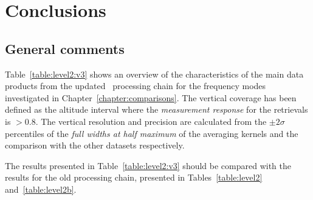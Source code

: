 \chapter{Conclusions}
\label{chapter:conclusions}
\section{General comments}
Table~\ref{table:level2:v3} shows an overview of the characteristics of the
main data products from the updated \smr\ processing chain for the frequency
modes investigated in Chapter~\ref{chapter:comparisons}. The vertical coverage
has been defined as the altitude interval where the \emph{measurement response}
for the retrievals is $>0.8$. The vertical resolution and precision are
calculated from the $\pm 2\sigma$ percentiles of the \emph{full widths at half
maximum} of the averaging kernels and the comparison with the other datasets respectively.

The results presented in Table~\ref{table:level2:v3} should be compared with
the results for the old processing chain, presented in
Tables~\ref{table:level2} and~\ref{table:level2b}.

